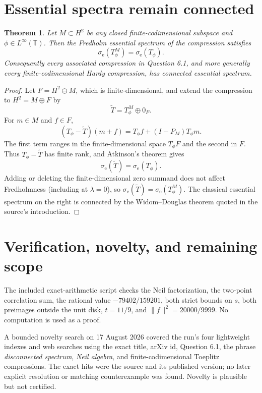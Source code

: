 \documentclass[11pt]{article}
\newtheorem{theorem}{Theorem}
\newcommand{\T}{\mathbb T}
\begin{document}
\section{Essential spectra remain connected}

\begin{theorem}\label{thm:essential}
Let $M\subset H^2$ be any closed finite-codimensional subspace and
$\phi\in L^\infty(\T)$.  Then the Fredholm essential spectrum of the
compression satisfies
\[
                         \sigma_{\mathrm e}(T_\phi^M)
                         =\sigma_{\mathrm e}(T_\phi).
\]
Consequently every associated compression in Question 6.1, and more
generally every finite-codimensional Hardy compression, has connected
essential spectrum.
\end{theorem}

\begin{proof}
Let $F=H^2\ominus M$, which is finite-dimensional, and extend the compression
to $H^2=M\oplus F$ by
\[
                    \widetilde T=T_\phi^M\oplus0_F.
\]
For $m\in M$ and $f\in F$,
\[
 (T_\phi-\widetilde T)(m+f)
 =T_\phi f+(I-P_M)T_\phi m.
\]
The first term ranges in the finite-dimensional space $T_\phi F$ and the
second in $F$.  Thus $T_\phi-\widetilde T$ has finite rank, and Atkinson's
theorem gives
\[
                    \sigma_{\mathrm e}(\widetilde T)
                    =\sigma_{\mathrm e}(T_\phi).
\]
Adding or deleting the finite-dimensional zero summand does not affect
Fredholmness (including at $\lambda=0$), so
$\sigma_{\mathrm e}(\widetilde T)=\sigma_{\mathrm e}(T_\phi^M)$.
The classical essential spectrum on the right is connected by the
Widom--Douglas theorem quoted in the source's introduction.
\end{proof}

\section{Verification, novelty, and remaining scope}

The included exact-arithmetic script checks the Neil factorization, the
two-point correlation sum, the rational value
$-79402/159201$, both strict bounds on $s$, both preimages outside the unit
disk, $t=11/9$, and $\|f\|^2=20000/9999$.  No computation is used as a proof.

A bounded novelty search on 17 August 2026 covered the run's four lightweight
indexes and web searches using the exact title, arXiv id, Question 6.1, the
phrase \emph{disconnected spectrum}, \emph{Neil algebra}, and
finite-codimensional Toeplitz compressions.  The exact hits were the source
and its published version; no later explicit resolution or matching
counterexample was found.  Novelty is plausible but not certified.
\end{document}
